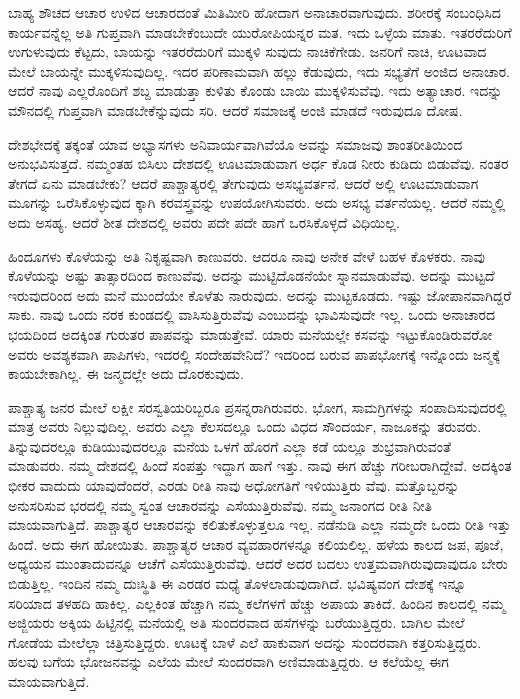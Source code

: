 ಬಾಹ್ಯ ಶೌಚದ ಆಚಾರ ಉಳಿದ ಆಚಾರದಂತೆ ಮಿತಿಮೀರಿ ಹೋದಾಗ ಅನಾಚಾರವಾಗುವುದು. ಶರೀರಕ್ಕೆ ಸಂಬಂಧಿಸಿದ ಕಾರ್ಯವನ್ನೆಲ್ಲ ಅತಿ ಗುಪ್ತವಾಗಿ ಮಾಡಬೇಕೆಂಬುದೇ ಯುರೋಪಿಯನ್ನರ ಮತ. ಇದು ಒಳ್ಳೆಯ ಮಾತು. ಇತರರೆದುರಿಗೆ ಉಗುಳುವುದು ಕೆಟ್ಟದು, ಬಾಯನ್ನು ಇತರರೆದುರಿಗೆ ಮುಕ್ಕಳಿ ಸುವುದು ನಾಚಿಕೆಗೇಡು. ಜನರಿಗೆ ನಾಚಿ, ಊಟವಾದ ಮೇಲೆ ಬಾಯನ್ನೇ ಮುಕ್ಕಳಿಸುವುದಿಲ್ಲ. ಇದರ ಪರಿಣಾಮವಾಗಿ ಹಲ್ಲು ಕೆಡುವುದು, ಇದು ಸಭ್ಯತೆಗೆ ಅಂಜಿದ ಅನಾಚಾರ. ಆದರೆ ನಾವು ಎಲ್ಲರೊಂದಿಗೆ ಶಬ್ದ ಮಾಡುತ್ತಾ ಕುಳಿತು ಕೊಂಡು ಬಾಯಿ ಮುಕ್ಕಳಿಸುವೆವು. ಇದು ಅತ್ಯಾಚಾರ. ಇದನ್ನು ಮೌನದಲ್ಲಿ ಗುಪ್ತವಾಗಿ ಮಾಡಬೇಕೆನ್ನುವುದು ಸರಿ. ಆದರೆ ಸಮಾಜಕ್ಕೆ ಅಂಜಿ ಮಾಡದೆ ಇರುವುದೂ ದೋಷ.

ದೇಶಭೇದಕ್ಕೆ ತಕ್ಕಂತೆ ಯಾವ ಅಭ್ಯಾಸಗಳು ಅನಿವಾರ್ಯವಾಗಿವೆಯೊ ಅವನ್ನು ಸಮಾಜವು ಶಾಂತರೀತಿಯಿಂದ ಅನುಭವಿಸುತ್ತದೆ. ನಮ್ಮಂತಹ ಬಿಸಿಲು ದೇಶದಲ್ಲಿ ಊಟಮಾಡುವಾಗ ಅರ್ಧ ಕೊಡ ನೀರು ಕುಡಿದು ಬಿಡುವೆವು. ನಂತರ ತೇಗದೆ ಏನು ಮಾಡಬೇಕು? ಆದರೆ ಪಾಶ್ಚಾತ್ಯರಲ್ಲಿ ತೇಗುವುದು ಅಸಭ್ಯವರ್ತನೆ. ಆದರೆ ಅಲ್ಲಿ ಊಟಮಾಡುವಾಗ ಮೂಗನ್ನು ಒರೆಸಿಕೊಳ್ಳುವುದ ಕ್ಕಾಗಿ ಕರವಸ್ತ್ರವನ್ನು ಉಪಯೋಗಿಸುವರು. ಅದು ಅಸಭ್ಯ ವರ್ತನೆಯಲ್ಲ. ಆದರೆ ನಮ್ಮಲ್ಲಿ ಅದು ಅಸಹ್ಯ. ಆದರೆ ಶೀತ ದೇಶದಲ್ಲಿ ಅವರು ಪದೇ ಪದೇ ಹಾಗೆ ಒರಸಿಕೊಳ್ಳದೆ ವಿಧಿಯಿಲ್ಲ.

ಹಿಂದೂಗಳು ಕೊಳೆಯನ್ನು ಅತಿ ನಿಕೃಷ್ಟವಾಗಿ ಕಾಣುವರು. ಆದರೂ ನಾವು ಅನೇಕ ವೇಳೆ ಬಹಳ ಕೊಳಕರು. ನಾವು ಕೊಳೆಯನ್ನು ಅಷ್ಟು ತಾತ್ಸಾರದಿಂದ ಕಾಣುವೆವು. ಅದನ್ನು ಮುಟ್ಟಿದೊಡನೆಯೇ ಸ್ನಾನಮಾಡುವೆವು. ಅದನ್ನು ಮುಟ್ಟದೆ ಇರುವುದರಿಂದ ಅದು ಮನೆ ಮುಂದೆಯೇ ಕೊಳೆತು ನಾರುವುದು. ಅದನ್ನು ಮುಟ್ಟಕೂಡದು. ಇಷ್ಟು ಜೋಪಾನವಾಗಿದ್ದರೆ ಸಾಕು. ನಾವು ಒಂದು ನರಕ ಕುಂಡದಲ್ಲಿ ವಾಸಿಸುತ್ತಿರುವೆವು ಎಂಬುದನ್ನು ಭಾವಿಸುವುದೇ ಇಲ್ಲ. ಒಂದು ಅನಾಚಾರದ ಭಯದಿಂದ ಅದಕ್ಕಿಂತ ಗುರುತರ ಪಾಪವನ್ನು ಮಾಡುತ್ತೇವೆ. ಯಾರು ಮನೆಯಲ್ಲೇ ಕಸವನ್ನು ಇಟ್ಟುಕೊಂಡಿರುವರೋ ಅವರು ಅವಶ್ಯಕವಾಗಿ ಪಾಪಿಗಳು, ಇದರಲ್ಲಿ ಸಂದೇಹವೇನಿದೆ? ಇದರಿಂದ ಬರುವ ಪಾಪಭೋಗಕ್ಕೆ ಇನ್ನೊಂದು ಜನ್ಮಕ್ಕೆ ಕಾಯಬೇಕಾಗಿಲ್ಲ. ಈ ಜನ್ಮದಲ್ಲೇ ಅದು ದೊರಕುವುದು.

ಪಾಶ್ಚಾತ್ಯ ಜನರ ಮೇಲೆ ಲಕ್ಷೀ ಸರಸ್ವತಿಯರಿಬ್ಬರೂ ಪ್ರಸನ್ನರಾಗಿರುವರು. ಭೋಗ, ಸಾಮಗ್ರಿಗಳನ್ನು ಸಂಪಾದಿಸುವುದರಲ್ಲಿ ಮಾತ್ರ ಅವರು ನಿಲ್ಲುವುದಿಲ್ಲ. ಅವರು ಎಲ್ಲಾ ಕೆಲಸದಲ್ಲೂ ಒಂದು ವಿಧದ ಸೌಂದರ್ಯ, ನಾಜೂಕನ್ನು ತರುವರು. ತಿನ್ನುವುದರಲ್ಲೂ ಕುಡಿಯುವುದರಲ್ಲೂ ಮನೆಯ ಒಳಗೆ ಹೊರಗೆ ಎಲ್ಲಾ ಕಡೆ ಯಲ್ಲೂ ಶುಭ್ರವಾಗಿರುವಂತೆ ಮಾಡುವರು. ನಮ್ಮ ದೇಶದಲ್ಲಿ ಹಿಂದೆ ಸಂಪತ್ತು ಇದ್ದಾಗ ಹಾಗೆ ಇತ್ತು. ನಾವು ಈಗ ಹೆಚ್ಚು ಗರೀಬರಾಗಿದ್ದೇವೆ. ಅದಕ್ಕಿಂತ ಭೀಕರ ವಾದುದು ಯಾವುದೆಂದರೆ, ಎರಡು ರೀತಿ ನಾವು ಅಧೋಗತಿಗೆ ಇಳಿಯುತ್ತಿರು ವೆವು. ಮತ್ತೊಬ್ಬರನ್ನು ಅನುಸರಿಸುವ ಭರದಲ್ಲಿ ನಮ್ಮ ಸ್ವಂತ ಆಚಾರವನ್ನು ಎಸೆಯುತ್ತಿರುವೆವು. ನಮ್ಮ ಜನಾಂಗದ ರೀತಿ ನೀತಿ ಮಾಯವಾಗುತ್ತಿದೆ. ಪಾಶ್ಚಾತ್ಯರ ಆಚಾರವನ್ನು ಕಲಿತುಕೊಳ್ಳುತ್ತಲೂ ಇಲ್ಲ. ನಡೆನುಡಿ ಎಲ್ಲಾ ನಮ್ಮದೇ ಒಂದು ರೀತಿ ಇತ್ತು ಹಿಂದೆ. ಅದು ಈಗ ಹೋಯಿತು. ಪಾಶ್ಚಾತ್ಯರ ಆಚಾರ ವ್ಯವಹಾರಗಳನ್ನೂ ಕಲಿಯಲಿಲ್ಲ. ಹಳೆಯ ಕಾಲದ ಜಪ, ಪೂಜೆ, ಅಧ್ಯಯನ ಮುಂತಾದುವನ್ನೂ ಆಚೆಗೆ ಎಸೆಯುತ್ತಿರುವೆವು. ಆದರೆ ಅದರ ಬದಲು ಉತ್ತಮವಾಗಿರುವುದಾವುದೂ ಬೇರು ಬಿಡುತ್ತಿಲ್ಲ. ಇಂದಿನ ನಮ್ಮ ದುಃಸ್ಥಿತಿ ಈ ಎರಡರ ಮಧ್ಯೆ ತೊಳಲಾಡುವುದಾಗಿದೆ. ಭವಿಷ್ಯವಂಗ ದೇಶಕ್ಕೆ ಇನ್ನೂ ಸರಿಯಾದ ತಳಹದಿ ಹಾಕಿಲ್ಲ. ಎಲ್ಲಕಿಂತ ಹೆಚ್ಚಾಗಿ ನಮ್ಮ ಕಲೆಗಳಗೆ ಹೆಚ್ಚು ಅಪಾಯ ತಾಕಿದೆ. ಹಿಂದಿನ ಕಾಲದಲ್ಲಿ ನಮ್ಮ ಅಜ್ಜಿಯರು ಅಕ್ಕಿಯ ಹಿಟ್ಟಿನಲ್ಲಿ ಮನೆಯಲ್ಲಿ ಅತಿ ಸುಂದರವಾದ ಹಸೆಗಳನ್ನು ಬರೆಯುತ್ತಿದ್ದರು. ಬಾಗಿಲ ಮೇಲೆ ಗೋಡೆಯ ಮೇಲೆಲ್ಲಾ ಚಿತ್ರಿಸುತ್ತಿದ್ದರು. ಊಟಕ್ಕೆ ಬಾಳೆ ಎಲೆ ಹಾಕುವಾಗ ಅದನ್ನು ಸುಂದರವಾಗಿ ಕತ್ತರಿಸುತ್ತಿದ್ದರು. ಹಲವು ಬಗೆಯ ಭೋಜನವನ್ನು ಎಲೆಯ ಮೇಲೆ ಸುಂದರವಾಗಿ ಅಣಿಮಾಡುತ್ತಿದ್ದರು. ಆ ಕಲೆಯೆಲ್ಲ ಈಗ ಮಾಯವಾಗುತ್ತಿದೆ.

